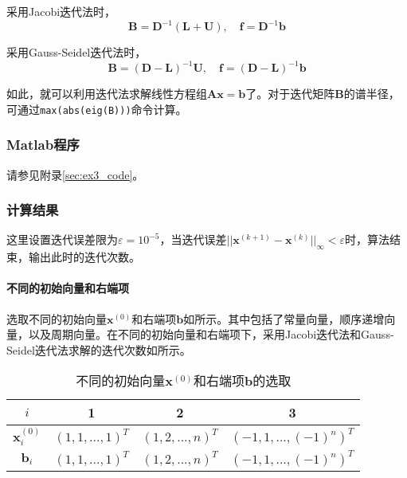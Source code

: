 \documentclass[12pt,a4paper]{article}
\begin{document}
采用Jacobi迭代法时，
\begin{equation}
    \boldsymbol{B} = \boldsymbol{D}^{-1}(\boldsymbol{L} + \boldsymbol{U}), \quad \boldsymbol{f} = \boldsymbol{D}^{-1}\boldsymbol{b}
\end{equation}

采用Gauss-Seidel迭代法时，
\begin{equation}
    \boldsymbol{B} = (\boldsymbol{D} - \boldsymbol{L})^{-1} \boldsymbol{U}, \quad \boldsymbol{f} = (\boldsymbol{D} - \boldsymbol{L})^{-1} \boldsymbol{b}
\end{equation}

如此，就可以利用迭代法求解线性方程组$\boldsymbol{Ax} = \boldsymbol{b}$了。对于迭代矩阵$\boldsymbol{B}$的谱半径，可通过\texttt{max(abs(eig(B)))}命令计算。

\subsubsection{Matlab程序}

请参见附录\ref{sec:ex3_code}。

\subsubsection{计算结果}

这里设置迭代误差限为$\varepsilon=10^{-5}$，当迭代误差$||\boldsymbol{x}^{(k+1)} - \boldsymbol{x}^{(k)}||_{\infty} < \varepsilon$时，算法结束，输出此时的迭代次数。

\paragraph{不同的初始向量和右端项} 选取不同的初始向量$\boldsymbol{x}^{(0)}$和右端项$\boldsymbol{b}$如所示。其中包括了常量向量，顺序递增向量，以及周期向量。在不同的初始向量和右端项下，采用Jacobi迭代法和Gauss-Seidel迭代法求解的迭代次数如所示。

\begin{table}
    \centering
    \caption{不同的初始向量$\boldsymbol{x}^{(0)}$和右端项$\boldsymbol{b}$的选取}
    \label{tab:ex3_x_b}
    \begin{tabular}{c|ccc}
        \toprule
        \(i\) & 1 & 2 & 3\tabularnewline
        \midrule
        \(\boldsymbol{x}^{(0)}_i\) & \((1,1,...,1)^T\) & \((1,2,...,n)^T\) &
        \((-1,1,...,(-1)^n)^T\)\tabularnewline
        \(\boldsymbol{b}_i\) & \((1,1,...,1)^T\) & \((1,2,...,n)^T\) &
        \((-1,1,...,(-1)^n)^T\)\tabularnewline
        \bottomrule
    \end{tabular}
\end{table}
\end{document}
